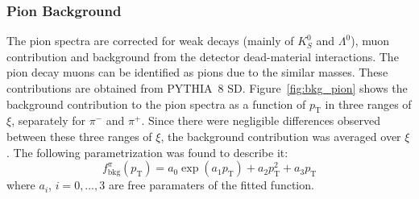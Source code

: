 \subsubsection{Pion Background}\label{section:star_background_pion}
The pion spectra are corrected for weak decays (mainly of $K^0_S$ and $\Lambda^0$), muon contribution and background from the   detector dead-material interactions. The pion decay muons can be identified as pions due to the similar masses. These contributions are obtained from PYTHIA~8 \ac{SD}. Figure~\ref{fig:bkg_pion} shows the background contribution to the pion spectra as a function of $p_\textrm{T}$ in three ranges of $\xi$, separately for $\pi^-$ and $\pi^+$.  Since there were   negligible differences  observed between these  three ranges of $\xi$, the background contribution was averaged over $\xi$. The following parametrization was found to describe it:
\begin{equation}
f_{\textrm{bkg}}^{\pi}\left(p_\textrm{T}\right)=a_0\exp(a_1p_\textrm{T})+a_2p_\textrm{T}^2+a_3p_\textrm{T}
\end{equation}
where $a_i$, $i=0,\dots, 3$ are free paramaters of the fitted function. 

